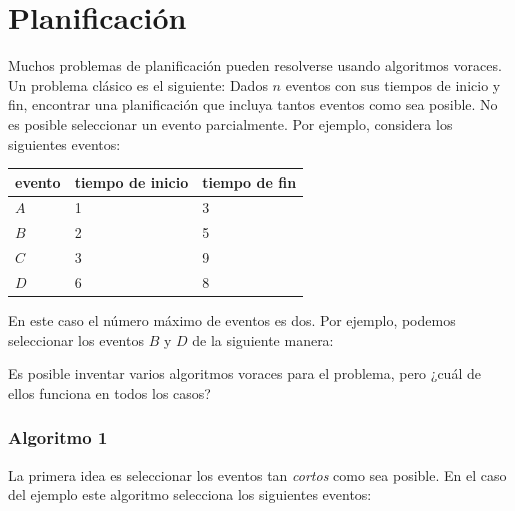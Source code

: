 \section{Planificación}

Muchos problemas de planificación pueden resolverse
usando algoritmos voraces.
Un problema clásico es el siguiente:
Dados $n$ eventos con sus tiempos de inicio y
fin, encontrar una planificación
que incluya tantos eventos como sea posible.
No es posible seleccionar un evento parcialmente.
Por ejemplo, considera los siguientes eventos:
\begin{center}
\begin{tabular}{lll}
evento & tiempo de inicio & tiempo de fin \\
\hline
$A$ & 1 & 3 \\
$B$ & 2 & 5 \\
$C$ & 3 & 9 \\
$D$ & 6 & 8 \\
\end{tabular}
\end{center}
En este caso el número máximo de eventos es dos.
Por ejemplo, podemos seleccionar los eventos $B$ y $D$
de la siguiente manera:
\begin{center}
\end{center}

Es posible inventar varios algoritmos voraces
para el problema, pero ¿cuál de ellos funciona en todos los casos?

\subsubsection*{Algoritmo 1}

La primera idea es seleccionar los eventos
tan \emph{cortos} como sea posible.
En el caso del ejemplo este algoritmo
selecciona los siguientes eventos:
\begin{center}
\end{center}


